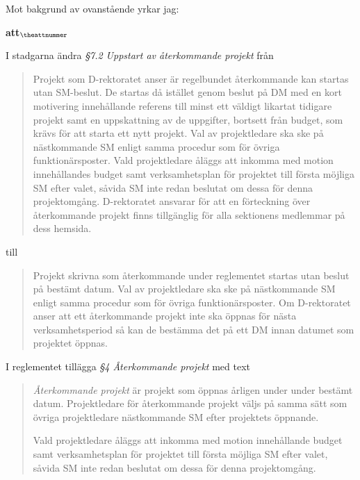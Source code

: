 \documentclass[a4paper]{article}
\begin{document}
	Mot bakgrund av ovanstående yrkar jag:

\setcounter{attnummer}{1}
\begin{list}{\bf att$_{\theattnummer}$}{}


\item I stadgarna ändra \textit{\S7.2 Uppstart av återkommande projekt} från
    \begin{quote}
        Projekt som D-rektoratet anser är regelbundet återkommande kan startas utan SM-beslut. De startas då istället genom beslut på DM med en kort motivering innehållande referens till minst ett väldigt likartat tidigare projekt samt en uppskattning av de uppgifter, bortsett från budget, som krävs för att starta ett nytt projekt. Val av projektledare ska ske på nästkommande SM enligt samma procedur som för övriga funktionärsposter. Vald projektledare åläggs att inkomma med motion innehållandes budget samt verksamhetsplan för projektet till första möjliga SM efter valet, såvida SM inte redan beslutat om dessa för denna projektomgång. D-rektoratet ansvarar för att en förteckning över återkommande projekt finns tillgänglig för alla sektionens medlemmar på dess hemsida.
    \end{quote}
    till
    \begin{quote}
        Projekt skrivna som återkommande under reglementet startas utan beslut på bestämt datum. Val av projektledare ska ske på nästkommande SM enligt samma procedur som för övriga funktionärsposter. Om D-rektoratet anser att ett återkommande projekt inte ska öppnas för nästa verksamhetsperiod så kan de bestämma det på ett DM innan datumet som projektet öppnas.
    \end{quote}


\item I reglementet tillägga \textit{\S4 Återkommande projekt} med text
    \begin{quote}
        \textit{Återkommande projekt} är projekt som öppnas årligen under under bestämt datum. Projektledare för återkommande projekt väljs på samma sätt som övriga projektledare nästkommande SM efter projektets öppnande.

        Vald projektledare åläggs att inkomma med motion innehållande budget samt verksamhetsplan för projektet till första möjliga SM efter valet, såvida SM inte redan beslutat om dessa för denna projektomgång.
    \end{quote}


\end{list}
\end{document}
